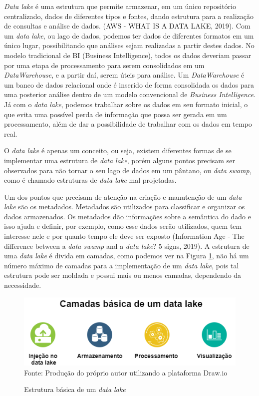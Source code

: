 \documentclass[
	12pt,				%
	openright,			%
	oneside,			%
	a4paper,			%
	chapter=TITLE,		%
	section=TITLE,		%
	subsection=TITLE,	%
	subsubsection=TITLE,%
	english,			%
	brazil				%
	]{abntex2}
\theoremstyle{definition}
\begin{document}
    \textit{Data lake} é uma estrutura  que permite armazenar, em um único repositório centralizado, dados de diferentes tipos e fontes, dando estrutura para a realização de consultas e análise de dados. (AWS - WHAT IS A DATA LAKE, 2019). Com um \textit{data lake}, ou lago de dados, podemos ter dados de diferentes formatos em um único lugar, possibilitando que análises sejam realizadas a partir destes dados.
    No modelo tradicional de BI (Business Intelligence), todos os dados deveriam passar por uma etapa de processamento para serem consolidados em um \textit{DataWarehouse}, e a partir daí, serem úteis para análise. Um \textit{DataWarehouse} é um banco de dados relacional onde é inserido de forma consolidada os dados para uma posterior análise dentro de um modelo convencional de \textit{Business Intelligence}. Já com o \textit{data lake}, podemos trabalhar sobre os dados em seu formato inicial, o que evita uma possível perda de informação que possa ser gerada em um processamento, além de dar a possibilidade de trabalhar com os dados em tempo real. 
    
    O \textit{data lake} é apenas um conceito, ou seja, existem diferentes formas de se implementar uma estrutura de \textit{data lake}, porém alguns pontos precisam ser observados para não tornar o seu lago de dados em um pântano, ou \textit{data swamp}, como é chamado estruturas de \textit{data lake} mal projetadas. 
    
    Um dos pontos que precisam de atenção na criação e manutenção de um \textit{data lake} são os metadados. Metadados são utilizados para classificar e organizar os dados armazenados. Os metadados dão informações sobre a semântica do dado e isso ajuda e definir, por exemplo, como esse dados serão utilizados, quem tem interesse nele e por quanto tempo ele deve ser exposto (Information Age - The difference between a \textit{data swamp} and a \textit{data lake}? 5 signs, 2019). A estrutura de uma \textit{data lake} é divida em camadas, como podemos ver na Figura \ref{Estrutura data lake},  não há um número máximo de camadas para a implementação de um \textit{data lake}, pois tal estrutura pode ser moldada e possui mais ou menos camadas, dependendo da necessidade.
    
    \begin{figure}[H]
         \centering
         \caption{Estrutura básica de um \textit{data lake}}
         \includegraphics[scale=0.8]{imagens/estrutura-datalake.png}
         \\{\footnotesize Fonte: Produção do próprio autor utilizando a plataforma Draw.io}
         \label{Estrutura data lake}
    \end{figure}
    
\end{document}
